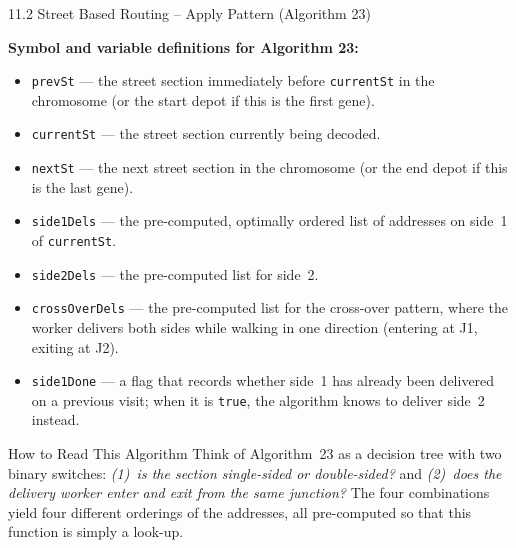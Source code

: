 \documentclass[aspectratio=169,10pt]{beamer}
\begin{document}
\begin{frame}[allowframebreaks]{11.2 Street Based Routing -- Apply Pattern (Algorithm 23)}
  \framebreak

  \textbf{Symbol and variable definitions for Algorithm 23:}
  \begin{itemize}
    \item \texttt{prevSt} --- the street section immediately before
          \texttt{currentSt} in the chromosome (or the start depot if this
          is the first gene).
    \item \texttt{currentSt} --- the street section currently being decoded.
    \item \texttt{nextSt} --- the next street section in the chromosome
          (or the end depot if this is the last gene).
    \item \texttt{side1Dels} --- the pre-computed, optimally ordered list of
          addresses on side~1 of \texttt{currentSt}.
    \item \texttt{side2Dels} --- the pre-computed list for side~2.
    \item \texttt{crossOverDels} --- the pre-computed list for the
          cross-over pattern, where the worker delivers both sides while
          walking in one direction (entering at J1, exiting at J2).
    \item \texttt{side1Done} --- a flag that records whether side~1 has
          already been delivered on a previous visit; when it is \texttt{true},
          the algorithm knows to deliver side~2 instead.
  \end{itemize}

  \begin{alertblock}{How to Read This Algorithm}
    Think of Algorithm~23 as a decision tree with two binary switches:
    \emph{(1)~is the section single-sided or double-sided?} and
    \emph{(2)~does the delivery worker enter and exit from the same junction?}
    The four combinations yield four different orderings of the addresses,
    all pre-computed so that this function is simply a look-up.
  \end{alertblock}

\end{frame}
\end{document}
